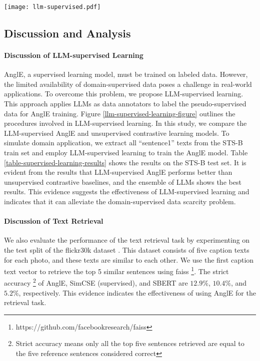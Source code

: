 \documentclass{article} \usepackage{iclr2024_conference,times}
\begin{document}
\begin{figure*}[ht]
    \centering
    \texttt{[image: llm-supervised.pdf]}
    \caption{The procedures of the LLM-supervised learning. For the STS task, we use the prompt ``\textit{You are a highly smart same-meaning/opposite-meaning sentence-generating system. Your job is to generate \{size\} synonymous/antonym sentences of a given input sentence. Input sentence: \{text\}. Output:}'' to generate positive/negative pairs. \{size\} and \{text\} are placeholders for the generated size and the input text, respectively.}
    \label{llm-supervised-learning-figure}
\end{figure*}

\subsection{Discussion and Analysis}

\paragraph{Discussion of LLM-supervised Learning}
AnglE, a supervised learning model, must be trained on labeled data. However, the limited availability of domain-supervised data poses a challenge in real-world applications. To overcome this problem, we propose LLM-supervised learning. This approach applies LLMs as data annotators to label the pseudo-supervised data for AnglE training. Figure \ref{llm-supervised-learning-figure} outlines the procedures involved in LLM-supervised learning. In this study, we compare the LLM-supervised AnglE and unsupervised contrastive learning models. To simulate domain application, we extract all ``sentence1'' texts from the STS-B train set and employ LLM-supervised learning to train the AnglE model. Table \ref{table-supervised-learning-results} shows the results on the STS-B test set. It is evident from the results that LLM-supervised AnglE performs better than unsupervised contrastive baselines, and the ensemble of LLMs shows the best results.
This evidence suggests the effectiveness of LLM-supervised learning and indicates that it can alleviate the domain-supervised data scarcity problem.

\paragraph{Discussion of Text Retrieval}
\label{sec-long-text-retrieval}
We also evaluate the performance of the text retrieval task by experimenting on the test split of the flickr30k dataset \citep{young-etal-2014-image}. This dataset consists of five caption texts for each photo, and these texts are similar to each other. We use the first caption text vector to retrieve the top 5 similar sentences using faiss \footnote{https://github.com/facebookresearch/faiss}. The strict accuracy \footnote{Strict accuracy means only all the top five sentences retrieved are equal to the five reference sentences considered correct} of AnglE, SimCSE (supervised), and SBERT are $12.9\%$, $10.4\%$, and $5.2\%$, respectively. This evidence indicates the effectiveness of using AnglE for the retrieval task. 
\end{document}
